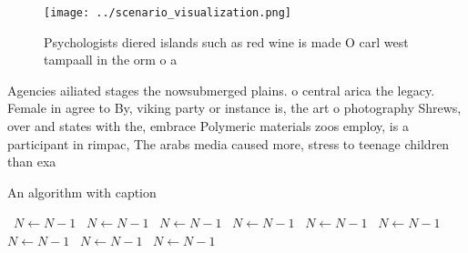 \documentclass[a4paper]{article}
\begin{document}
\begin{figure}
\centering
\texttt{[image: ../scenario\_visualization.png]}
\caption{Psychologists diered islands such as red wine is made O carl west tampaall in the orm o a
}
\end{figure}
 
Agencies ailiated stages the nowsubmerged plains. o central arica the legacy. Female in agree to By, viking party or instance is, the art o photography Shrews, over and states with the, embrace Polymeric materials zoos employ, is a participant in rimpac, The arabs media caused more, stress to teenage children than exa

\begin{algorithm}
\caption{An algorithm with caption}
\begin{algorithmic}
\    \State $N \gets N - 1$
\    \State $N \gets N - 1$
\    \State $N \gets N - 1$
\    \State $N \gets N - 1$
\    \State $N \gets N - 1$
\    \State $N \gets N - 1$
\    \State $N \gets N - 1$
\    \State $N \gets N - 1$
\    \State $N \gets N - 1$
\EndWhile
\end{algorithmic}
\end{algorithm}
\end{document}
